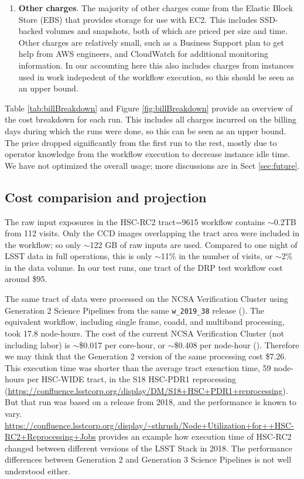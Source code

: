 \begin{enumerate}
\item \textbf{Other charges}.
The majority of other charges come from the Elastic Block Store (EBS) that provides storage for use with EC2.
This includes SSD-backed volumes and snapshots, both of which are priced per size and time.
Other charges are relatively small, such as a Business Support plan to get help from AWS engineers, and CloudWatch for additional monitoring information.
In our accounting here this also includes charges from instances used in work indepedent of the workflow execution, so this should be seen as an upper bound.

\end{enumerate}

Table \ref{tab:billBreakdown} and Figure \ref{fig:billBreakdown} provide an overview of the cost breakdown for each run.
This includes all charges incurred on the billing days during which the runs were done, so this can be seen as an upper bound.
The price dropped significantly from the first run to the rest, mostly due to operator knowledge from the workflow execution to decrease instance idle time.
We have not optimized the overall usage; more discussions are in Sect \ref{sec:future}.



\subsection{Cost comparision and projection}

The raw input exposures in the HSC-RC2 tract=9615 workflow contains $\sim$0.2TB from 112 visits.
Only the CCD images overlapping the tract area were included in the workflow; so only $\sim$122 GB of raw inputs are used.
Compared to one night of LSST data in full operations, this is only $\sim$11\% in the number of visits, or $\sim$2\% in the data volume.
In our test runs, one tract of the DRP test workflow cost around \$95.

The same tract of data were processed on the NCSA Verification Cluster using Generation 2 Science Pipelines from the same \texttt{w\_2019\_38} release ().
The equivalent workflow, including single frame, coadd, and multiband processing, took 17.8 node-hours.
The cost of the current NCSA Verification Cluster (not including labor) is $\sim$\$0.017 per core-hour, or $\sim$\$0.408 per node-hour ().
Therefore we may think that the Generation 2 version of the same processing cost \$7.26.
This execution time was shorter than the average tract exeuction time, 59 node-hours per HSC-WIDE tract, in the S18 HSC-PDR1 reprocessing (\url{https://confluence.lsstcorp.org/display/DM/S18+HSC+PDR1+reprocessing}).
But that run was based on a release from 2018, and the performance is known to vary.
\url{https://confluence.lsstcorp.org/display/~sthrush/Node+Utilization+for++HSC-RC2+Reprocessing+Jobs} provides an example how execution time of HSC-RC2 changed between different versions of the LSST Stack in 2018.
The performance differences between Generation 2 and Generation 3 Science Pipelines is not well understood either.

